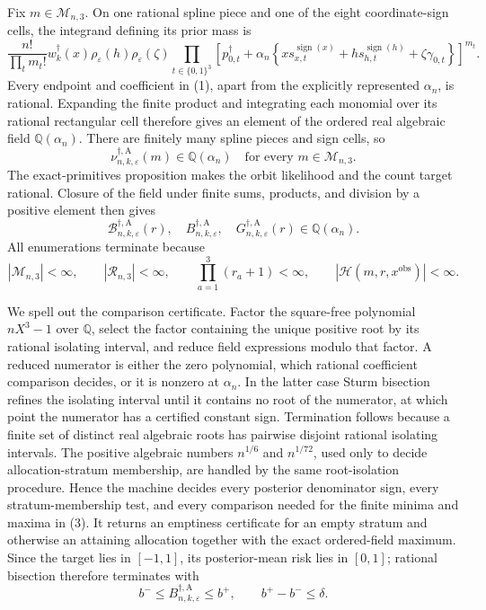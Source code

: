 Fix \(m\in\mathcal M_{n,3}\).  On one rational spline piece and one of the eight
coordinate-sign cells, the integrand defining its prior mass is
\[
 \frac{n!}{\prod_tm_t!}
 w_k^\dagger(x)\rho_\varepsilon(h)\rho_\varepsilon(\zeta)
 \prod_{t\in\{0,1\}^3}
 \left[p_{0,t}^\dagger+\alpha_n
 \left\{xs_{x,t}^{\operatorname{sign}(x)}
 +hs_{h,t}^{\operatorname{sign}(h)}+\zeta\gamma_{0,t}\right\}
 \right]^{m_t}.
\tag{1}
\]
Every endpoint and coefficient in (1), apart from the explicitly represented
\(\alpha_n\), is rational.  Expanding the finite product and integrating each
monomial over its rational rectangular cell therefore gives an element of the
ordered real algebraic field \(\mathbb Q(\alpha_n)\).  There are finitely many
spline pieces and sign cells, so
\[
 \nu_{n,k,\varepsilon}^{\dagger,\mathrm A}(m)
 \in\mathbb Q(\alpha_n)
 \quad\text{for every }m\in\mathcal M_{n,3}.
\tag{2}
\]
The exact-primitives proposition makes the orbit likelihood and the count target
rational.  Closure of the field under finite sums, products, and division by a
positive element then gives
\[
 \mathcal B_{n,k,\varepsilon}^{\dagger,\mathrm A}(r),\quad
 B_{n,k,\varepsilon}^{\dagger,\mathrm A},\quad
 G_{n,k,\varepsilon}^{\dagger,\mathrm A}(r)
 \in\mathbb Q(\alpha_n).
\tag{3}
\]
All enumerations terminate because
\[
 |\mathcal M_{n,3}|<\infty,
 \qquad |\mathcal R_{n,3}|<\infty,
 \qquad \prod_{a=1}^3(r_a+1)<\infty,
 \qquad |\mathcal H(m,r,x^{\mathrm{obs}})|<\infty.
\tag{4}
\]

We spell out the comparison certificate.  Factor the square-free polynomial
\(nX^3-1\) over \(\mathbb Q\), select the factor containing the unique positive
root by its rational isolating interval, and reduce field expressions modulo that
factor.  A reduced numerator is either the zero polynomial, which rational
coefficient comparison decides, or it is nonzero at \(\alpha_n\).  In the latter
case Sturm bisection refines the isolating interval until it contains no root of the
numerator, at which point the numerator has a certified constant sign.  Termination
follows because a finite set of distinct real algebraic roots has pairwise disjoint
rational isolating intervals.  The positive algebraic numbers \(n^{1/6}\) and
\(n^{1/72}\), used only to decide allocation-stratum membership, are handled by
the same root-isolation procedure.  Hence the machine decides every posterior
denominator sign, every stratum-membership test, and every comparison needed for
the finite minima and maxima in (3).  It returns an emptiness certificate for an
empty stratum and otherwise an attaining allocation together with the exact
ordered-field maximum.  Since the target lies in \([-1,1]\), its posterior-mean
risk lies in \([0,1]\); rational bisection therefore terminates with
\[
 b^-\le B_{n,k,\varepsilon}^{\dagger,\mathrm A}\le b^+,
 \qquad b^+-b^-\le\delta.
\tag{5}
\]

